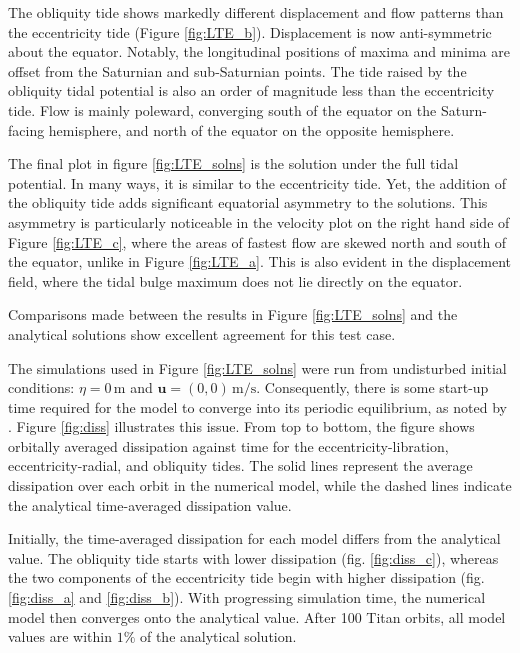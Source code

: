 The obliquity tide shows markedly different displacement and flow patterns than the eccentricity tide (Figure \ref{fig:LTE_b}). Displacement is now anti-symmetric about the equator. Notably, the longitudinal positions of maxima and minima are offset from the Saturnian and sub-Saturnian points. The tide raised by the obliquity tidal potential is also an order of magnitude less than the eccentricity tide. Flow is mainly poleward, converging south of the equator on the Saturn-facing hemisphere, and north of the equator on the opposite hemisphere.

The final plot in figure \ref{fig:LTE_solns} is the solution under the full tidal potential. In many ways, it is similar to the eccentricity tide. Yet, the addition of the obliquity tide adds significant equatorial asymmetry to the solutions. This asymmetry is particularly noticeable in the velocity plot on the right hand side of Figure \ref{fig:LTE_c}, where the areas of fastest flow are skewed north and south of the equator, unlike in Figure \ref{fig:LTE_a}. This is also evident in the displacement field, where the tidal bulge maximum does not lie directly on the equator.

Comparisons made between the results in Figure \ref{fig:LTE_solns} and the analytical solutions show excellent agreement for this test case.

The simulations used in Figure \ref{fig:LTE_solns} were run from undisturbed initial conditions: \hbox{$\eta = 0 \, \si{\metre}$} and \hbox{$\bm{u} = (0,0) \, \si{\metre\per\second}$}. Consequently, there is some start-up time required for the model to converge into its periodic equilibrium, as noted by \citet{sears1995tidal}. Figure \ref{fig:diss} illustrates this issue. From top to bottom, the figure shows orbitally averaged dissipation against time for the eccentricity-libration, eccentricity-radial, and obliquity tides.  The solid lines represent the average dissipation over each orbit in the numerical model, while the dashed lines indicate the analytical time-averaged dissipation value. 

Initially, the time-averaged dissipation for each model differs from the analytical value. The obliquity tide starts with lower dissipation (fig. \ref{fig:diss_c}), whereas the two components of the eccentricity tide begin with higher dissipation (fig. \ref{fig:diss_a} and \ref{fig:diss_b}). With progressing simulation time, the numerical model then converges onto the analytical value. After 100 Titan orbits, all model values are within $1 \si{\percent}$ of the analytical solution. 

